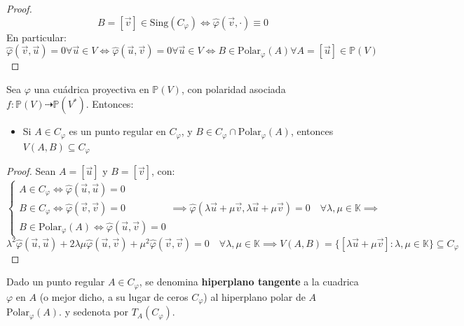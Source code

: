 \begin{proof}
    \[
    B = [\vec{v}] \in \text{Sing}(C_{\varphi}) \iff
    \hat{\varphi}(\vec{v}, \cdot) \equiv 0
    \]
    En particular:
    \[
    \hat{\varphi}(\vec{v}, \vec{u}) = 0 \forall \vec{u} \in V \iff
    \hat{\varphi}(\vec{u}, \vec{v}) = 0 \forall \vec{u} \in V \iff
    B \in \text{Polar}_\varphi(A) \forall A = [\vec{u}] \in \mathbb{P}(V)
    \]
\end{proof}
    
\begin{proposición}
    Sea $\varphi$ una cuádrica proyectiva en $\mathbb{P}(V)$, con polaridad asociada $f : \mathbb{P}(V) \dashrightarrow \mathbb{P}(V^*)$. Entonces:
    \begin{itemize}
        \item Si $A \in C_{\varphi}$ es un punto regular en $C_{\varphi}$, y $B \in C_{\varphi} \cap \text{Polar}_\varphi(A)$, entonces $V(A,B) \subseteq C_{\varphi}$
    \end{itemize}
\end{proposición}

\begin{proof}
    Sean $A=[\vec{u}]$ y $B=[\vec{v}]$, con:
    \[
    \begin{cases}
        A \in C_{\varphi} \iff \hat{\varphi}(\vec{u}, \vec{u}) = 0 \\
        B \in C_{\varphi} \iff \hat{\varphi}(\vec{v}, \vec{v}) = 0 \\
        B \in \text{Polar}_\varphi(A) \iff \hat{\varphi}(\vec{u}, \vec{v}) = 0
    \end{cases}
    \implies \hat{\varphi}(\lambda \vec{u} + \mu \vec{v}, \lambda \vec{u} + \mu \vec{v}) = 0 \quad \forall \lambda, \mu \in \mathbb{K} \implies
    \]
    \[
    \lambda^2 \hat{\varphi}(\vec{u}, \vec{u}) +
    2 \lambda \mu \hat{\varphi}(\vec{u}, \vec{v}) +
    \mu^2 \hat{\varphi}(\vec{v}, \vec{v}) = 0 \quad \forall \lambda, \mu \in \mathbb{K} \implies
    V(A,B) = \{ [\lambda \vec{u} + \mu \vec{v}] : \lambda, \mu \in \mathbb{K} \} \subseteq C_{\varphi}
    \]
\end{proof}

\begin{definición}
    Dado un punto regular $A \in C_{\varphi}$, se denomina \textbf{hiperplano tangente} a la cuadrica $\varphi$ en $A$ (o mejor dicho, a su lugar de ceros $C_{\varphi}$) al hiperplano polar de $A$ $\text{Polar}_\varphi(A)$. y sedenota por $T_A (C_{\varphi})$.
\end{definición}

